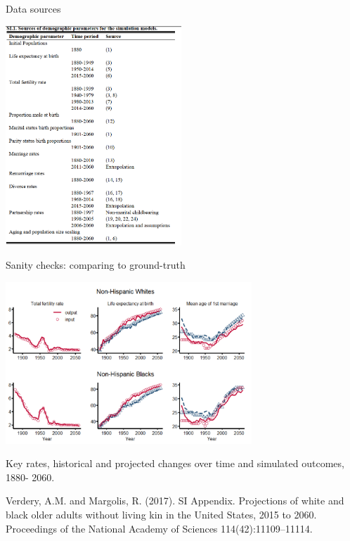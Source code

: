 \documentclass[
  ignorenonframetext,
]{beamer}
\begin{document}
\begin{frame}{Data sources}
\protect\hypertarget{data-sources}{}

\includegraphics[width=2.60417in,height=\textheight]{resources/verdery_sources.PNG}

\end{frame}

\begin{frame}{Sanity checks: comparing to ground-truth}
\protect\hypertarget{sanity-checks-comparing-to-ground-truth}{}

\includegraphics[width=3.64583in,height=\textheight]{resources/verdery_rates.PNG}

Key rates, historical and projected changes over time and simulated
outcomes, 1880- 2060.

\tiny Verdery, A.M. and Margolis, R. (2017). SI Appendix. Projections of
white and black older adults without living kin in the United States,
2015 to 2060. Proceedings of the National Academy of Sciences
114(42):11109--11114.

\end{frame}
\end{document}
